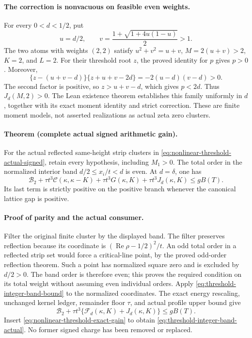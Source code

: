 \paragraph{The correction is nonvacuous on feasible even weights.}
For every \(0<d<1/2\), put
\[
 u=d/2,\qquad v=\frac{1+\sqrt{1+4u(1-u)}}2>1.
\]
The two atoms with weights \((2,2)\) satisfy
\(u^2+v^2=u+v\), \(M=2(u+v)>2\), \(K=2\), and \(L=2\).
For their threshold root \(z\), the proved identity for \(p\) gives
\(p>0\).  Moreover,
\[
 \{z-(u+v-d)\}\{z+u+v-2d\}=-2(u-d)(v-d)>0.
\]
The second factor is positive, so \(z>u+v-d\), which gives \(p<2d\).
Thus \(J_d(M,2)>0\).  The Lean existence theorem establishes this
family uniformly in \(d\), together with its exact moment identity and
strict correction.  These are finite moment models, not asserted
realizations as actual zeta zero clusters.

\paragraph{Theorem (complete actual signed arithmetic gain).}
For the actual reflected same-height strip clusters in
\eqref{eq:nonlinear-threshold-actual-signed}, retain every hypothesis,
including \(M_1>0\).  The total order in the normalized interior band
\(d/2\le x_i/t<d\) is even.  At \(d=\delta\), one has
\begin{equation}
 \mathcal B_2+\tau t^3\mathcal C(\kappa,\kappa-K)
  +\tau t^3G(\kappa,K)+\tau t^3J_d(\kappa,K)\le gB(T).
 \label{eq:threshold-integer-band-actual}
\end{equation}
Its last term is strictly positive on the positive branch whenever the
canonical lattice gap is positive.

\paragraph{Proof of parity and the actual consumer.}
Filter the original finite cluster by the displayed band.  The filter
preserves reflection because its coordinate is
\((\operatorname{Re}\rho-1/2)^2/t\).  An odd total order in a reflected
strip set would force a critical-line point, by the proved odd-order
reflection theorem.  Such a point has normalized square zero and is
excluded by \(d/2>0\).  The band order is therefore even; this proves the
required condition on its total weight without assuming even individual
orders.  Apply \eqref{eq:threshold-integer-band-bound} to the normalized
coordinates.  The exact energy rescaling, unchanged kernel ledger,
remainder floor \(\tau\), and actual profile upper bound give
\[
 \mathcal B_2+\tau t^3\{\mathcal F_d(\kappa,K)+J_d(\kappa,K)\}
 \le gB(T).
\]
Insert \eqref{eq:nonlinear-threshold-exact-gain} to obtain
\eqref{eq:threshold-integer-band-actual}.  No former signed charge has
been removed or replaced.

